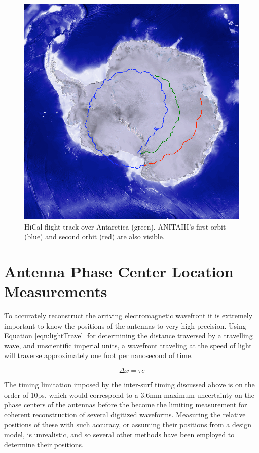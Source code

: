 \begin{figure}
	\includegraphics[width=\textwidth]{figures/hiCalFlight}
	\caption{HiCal flight track over Antarctica (green). ANITAIII's first orbit (blue) and second orbit (red) are also visible.}
	\label{fig:hiCalFlight}
\end{figure}		


\section{Antenna Phase Center Location Measurements}
	To accurately reconstruct the arriving electromagnetic wavefront it is extremely important to know the positions of the antennas to very high precision.   Using Equation \ref{eqn:lightTravel} for determining the distance traversed by a travelling wave, and unscientific imperial units, a wavefront traveling at the speed of light will traverse approximately one foot per nanosecond of time. 
	
\begin{equation}
	\Delta x = \tau c
	\label{eqn:lightTravel}
\end{equation}

	
	The timing limitation imposed by the inter-surf timing discussed above is on the order of 10ps, which would correspond to a 3.6mm maximum uncertainty on the phase centers of the antennas before the become the limiting measurement for coherent reconstruction of several digitized waveforms.  Measuring the relative positions of these with such accuracy, or assuming their positions from a design model, is unrealistic, and so several other methods have been employed to determine their positions.
	
